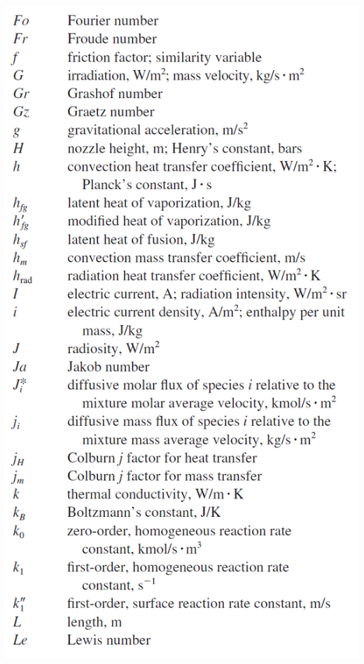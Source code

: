 \documentclass[10pt,landscape]{article}
\newenvironment{Figure}
     {\par\medskip\noindent\minipage{\linewidth}}
     {\endminipage\par\medskip}
\begin{document}
\begin{multicols}{3}
\begin{Figure}
    \includegraphics[width=\linewidth]{Symbols_2.png}
\end{Figure}
\begin{Figure}
    \centering

\end{Figure}
\end{multicols}
\end{document}
